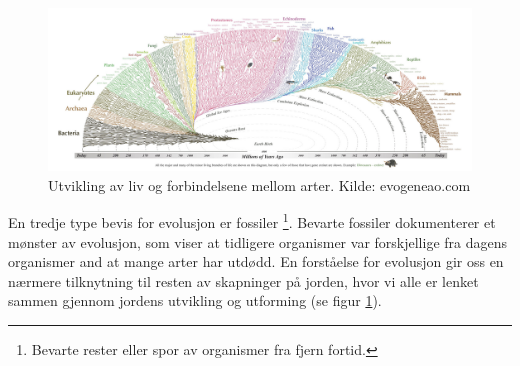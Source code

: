 \documentclass[main.tex]{subfiles}
\begin{document}
\begin{figure}
    \label{fig:evolusjon}
    \centering
    \includegraphics[width=1.1\textwidth,left]{../figures/utviklingavliv.jpg}
    \caption{Utvikling av liv og forbindelsene mellom arter. Kilde: evogeneao.com}
\end{figure}

\newpage
\hspace{-6mm}En tredje type bevis for evolusjon er fossiler \footnote{Bevarte rester eller spor av organismer fra fjern fortid.}. Bevarte fossiler dokumenterer et mønster av evolusjon, som viser at tidligere organismer var forskjellige fra dagens organismer and at mange arter har utdødd.
\newline\newline
En forståelse for evolusjon gir oss en nærmere tilknytning til resten av skapninger på jorden, hvor vi alle er lenket sammen gjennom jordens utvikling og utforming (se figur \ref{fig:evolusjon}).
\end{document}
